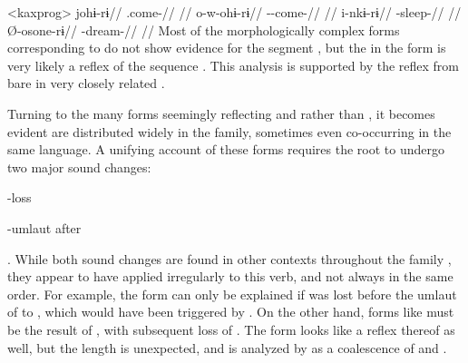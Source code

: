 \pex<kaxprog>\kaxui {}
\begingl
\gla johɨ-rɨ//
\glb {}.come-//
\glft {}//
\endgl
{}
\begingl
\gla o-w-ohɨ-rɨ//
\glb {}--come-//
\glft {}//
\endgl
{}
\begingl
\gla i-nkɨ-rɨ//
\glb {}-sleep-//
\glft {}//
\endgl
{}
\begingl
\gla Ø-osone-rɨ//
\glb {}-dream-//
\glft {}//
\endgl
\xe
%
Most of the morphologically complex forms corresponding to   do not show evidence for the segment , but the  in the \akawaio form  is very likely a reflex of the sequence .
This analysis is supported by the reflex  from bare  in very closely related \macushi.

Turning to the many forms seemingly reflecting  and  rather than , it becomes evident are distributed widely in the family, sometimes even co-occurring in the same language.
A unifying account of these forms requires the root  to undergo two major sound changes: \begin{inlinelist}
 \item {}-loss
 \item {}-umlaut after 
 \end{inlinelist}.
While both sound changes are found in other contexts throughout the family \parencite{meira2010origin}, they appear to have applied irregularly to this verb, and not always in the same order.
For example, the \kalina form  can only be explained if  was lost before the umlaut of  to , which would have been triggered by .
On the other hand, forms like \maqui {} must be the result of , with subsequent loss of .
The \akuriyo form  looks like a reflex thereof as well, but the length is unexpected, and is analyzed by \textcite[]{meira1998proto} as a coalescence of  and .


